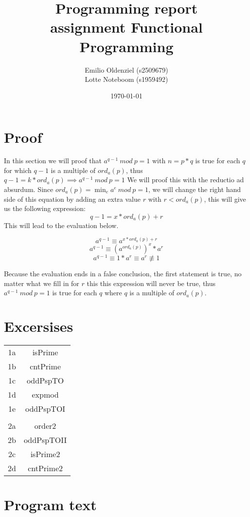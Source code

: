\documentclass[a4paper]{article}
\begin{document}
\title{Programming report\\
       assignment Functional Programming
}
\date{\today}
\author{Emilio Oldenziel (s2509679)\\  Lotte Noteboom (s1959492)}

\maketitle

\section{Proof}
In this section we will proof that $a^{q-1} \: mod \: p = 1 $ with $n=p*q$ is true for each $q$ for which
$q-1$ is a multiple of $ord_{a}(p)$, thus 
$q-1 = k * ord_{a}(p) \implies a^{q-1} \: mod \: p = 1$
We will proof this with the reductio ad absurdum. Since $ord_{a}(p) = \operatorname*{min}_e a^{e} \: mod \: p =1$, we will change the right
hand side of this equation by adding an extra value $r$ with $r < ord_{a}(p)$, this will give us the following expression:
\[q-1 = x * ord_{a}(p) + r\]
This will lead to the evaluation below.

\[a^{q - 1} \equiv a^{x*ord_{a}(p) + r}\]
\[a^{q - 1} \equiv (a^{ord_{a}(p)})^{x} * a^{r}\]
\[a^{q - 1} \equiv 1 * a^{r} \equiv a^{r} \not\equiv 1\]

Because the evaluation ends in a false conclusion, the first statement is true, no matter what we fill in for $r$ this
this expression will never be true, thus $a^{q-1} \: mod \: p = 1 $ is true for each $q$ where $q$ is a multiple of
$ord_{a}(p)$.

\section{Excersises}
\begin{tabular}{c|c}
1a & isPrime\\
1b & cntPrime\\
1c & oddPspTO\\
1d & expmod\\
1e & oddPspTOI\\
\\
2a & order2\\
2b & oddPspTOII\\
2c & isPrime2\\
2d & cntPrime2\\
\end{tabular}
\newpage
\section{Program text}

\end{document}

